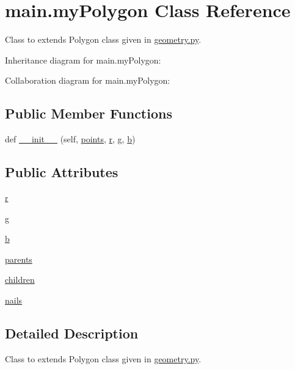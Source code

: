 \hypertarget{classmain_1_1myPolygon}{}\section{main.\+my\+Polygon Class Reference}
\label{classmain_1_1myPolygon}


Class to extends Polygon class given in \hyperlink{geometry_8py}{geometry.\+py}.  




Inheritance diagram for main.\+my\+Polygon\+:


Collaboration diagram for main.\+my\+Polygon\+:
\subsection*{Public Member Functions}
\begin{DoxyCompactItemize}
\item 
def \hyperlink{classmain_1_1myPolygon_a974677dc497cea8a04141b2cebe22fb3}{\+\_\+\+\_\+init\+\_\+\+\_\+} (self, \hyperlink{classgeometry_1_1Polygon_aa0fda1ff74a09b8498bd7d8731b2fbf1}{points}, \hyperlink{classmain_1_1myPolygon_a3a16fc82c5e401d7e6c30cc70325e7e1}{r}, \hyperlink{classmain_1_1myPolygon_a7165c70cd7d5acef520726f3c149d66d}{g}, \hyperlink{classmain_1_1myPolygon_aae536780928a8dbfede7116f565c5c65}{b})
\end{DoxyCompactItemize}
\subsection*{Public Attributes}
\begin{DoxyCompactItemize}
\item 
\hyperlink{classmain_1_1myPolygon_a3a16fc82c5e401d7e6c30cc70325e7e1}{r}
\item 
\hyperlink{classmain_1_1myPolygon_a7165c70cd7d5acef520726f3c149d66d}{g}
\item 
\hyperlink{classmain_1_1myPolygon_aae536780928a8dbfede7116f565c5c65}{b}
\item 
\hyperlink{classmain_1_1myPolygon_a880b71333498ffdf46de7011928e97de}{parents}
\item 
\hyperlink{classmain_1_1myPolygon_a00f7ba4c0aa3aa57b93a4325a84c3f36}{children}
\item 
\hyperlink{classmain_1_1myPolygon_a168cca63508d67021187c77ca843f9e3}{nails}
\end{DoxyCompactItemize}


\subsection{Detailed Description}
Class to extends Polygon class given in \hyperlink{geometry_8py}{geometry.\+py}. 

